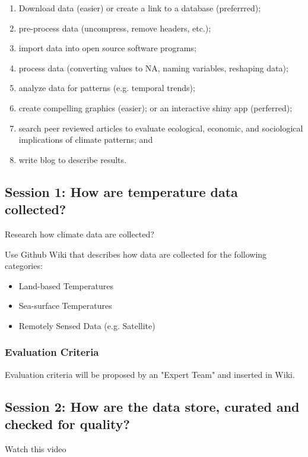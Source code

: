 \documentclass{article}\usepackage[]{graphicx}\usepackage[]{color}
\begin{document}
\begin{enumerate}
  \item Download data (easier) or create a link to a database (preferrred);
  \item pre-process data (uncompress, remove headers, etc.);
  \item import data into open source software programs;
  \item process data (converting values to NA, naming variables, reshaping data);
  \item analyze data for patterns (e.g. temporal trends);
  \item create compelling graphics (easier); or an interactive shiny app (perferred);
  \item search peer reviewed articles to evaluate ecological, economic, and sociological implications of climate patterns; and
  \item write blog to describe results. 
\end{enumerate}

\subsection{Session 1: How are temperature data collected?}

Research how climate data are collected?

Use Github Wiki that describes how data are collected for the following categories:

\begin{itemize}
  \item Land-based Temperatures
  \item Sea-surface Temperatures
  \item Remotely Sensed Data (e.g. Satellite) 
\end{itemize}

\subsubsection{Evaluation Criteria}

Evaluation criteria will be proposed by an "Expert Team" and inserted in Wiki. 

\subsection{Session 2: How are the data store, curated and checked for quality?}

Watch this video
\end{document}
